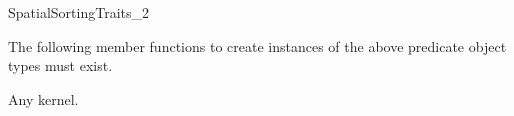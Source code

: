 \begin{ccRefConcept}{SpatialSortingTraits_2}
\ccOperations

The following member functions to create instances of the above predicate
object types must exist. 

\setlength\parskip{0mm}
\ccGlue
{}
\ccGlue
{}
\ccGlue
{}

\ccParDims
\ccHasModels

Any \cgal{} kernel.

\ccParDims
\end{ccRefConcept}


